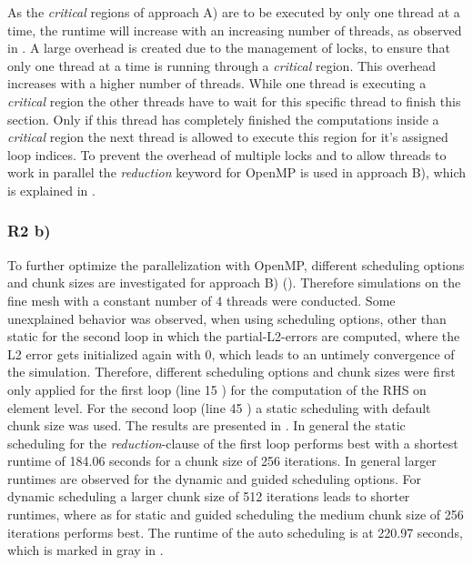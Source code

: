 As the \textit{critical} regions of approach A) are to be executed by only one thread at a time, the runtime will increase with an increasing number of threads, as observed in . A large overhead is created due to the management of locks, to ensure that only one thread at a time is running through a \textit{critical} region. This overhead increases with a higher number of threads. While one thread is executing a \textit{critical} region the other threads have to wait for this specific thread to finish this section. Only if this thread has completely finished the computations inside a \textit{critical} region the next thread is allowed to execute this region for it's assigned loop indices. To prevent the overhead of multiple locks and to allow threads to work in parallel the \textit{reduction} keyword for OpenMP is used in approach B), which is explained in . 

\subsubsection{R2 b) \label{sec:Scheduling}}

To further optimize the parallelization with OpenMP, different scheduling options and chunk sizes are investigated for approach B) (). Therefore simulations on the fine mesh with a constant number of 4 threads were conducted. Some unexplained behavior was observed, when using scheduling options, other than static for the second loop in which the partial-L2-errors are computed, where the L2 error gets initialized again with 0, which leads to an untimely convergence of the simulation. Therefore, different scheduling options and chunk sizes were first only applied for the first loop (line 15 ) for the computation of the RHS on element level. For the second loop (line 45 ) a static scheduling with default chunk size was used. The results are presented in . 
In general the static scheduling for the \textit{reduction}-clause of the first loop performs best with a shortest runtime of 184.06 seconds for a chunk size of 256 iterations. In general larger runtimes are observed for the dynamic and guided scheduling options. For dynamic scheduling a larger chunk size of 512 iterations leads to shorter runtimes, where as for static and guided scheduling the medium chunk size of 256 iterations performs best. The runtime of the auto scheduling is at 220.97 seconds, which is marked in gray in .

